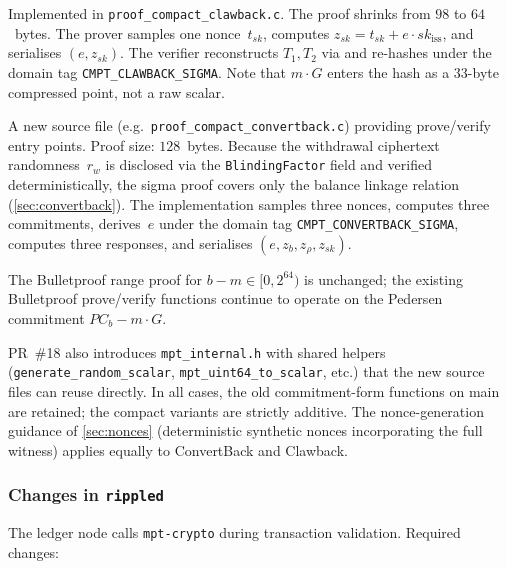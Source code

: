\documentclass[11pt]{article}
\theoremstyle{definition}
\newcommand{\sk}{\mathit{sk}}
\begin{document}
\begin{description}[style=nextline,leftmargin=1.5em]
  \item[Clawback (compact $\Pi_{\mathrm{claw}}$).]
    Implemented in \texttt{proof\_compact\_clawback.c}.
    The proof shrinks from $98$ to $64$~bytes.
    The prover samples one nonce~$t_{\sk}$, computes
    $z_{\sk} = t_{\sk} + e \cdot \sk_{\mathrm{iss}}$, and serialises
    $(e, z_{\sk})$.
    The verifier reconstructs $T_1, T_2$ via
     and re-hashes
    under the domain tag \texttt{CMPT\_CLAWBACK\_SIGMA}.
    Note that $m \cdot G$ enters the hash as a $33$-byte compressed
    point, not a raw scalar.

  \item[ConvertBack (compact $\Pi_{\mathrm{cb}}$).]
    A new source file (e.g.\
    \texttt{proof\_compact\_convertback.c}) providing
    prove/verify entry points.
    Proof size: $128$~bytes.
    Because the withdrawal ciphertext randomness~$r_w$ is
    disclosed via the \texttt{BlindingFactor} field and verified
    deterministically, the sigma proof covers only the balance
    linkage relation (\cref{sec:convertback}).
    The implementation samples three nonces, computes three
    commitments, derives~$e$ under the domain tag
    \texttt{CMPT\_CONVERTBACK\_SIGMA}, computes three responses,
    and serialises $(e, z_b, z_\rho, z_{\sk})$.

    The Bulletproof range proof for
    $b - m \in [0, 2^{64})$ is unchanged;
    the existing Bulletproof prove/verify functions continue to
    operate on the Pedersen commitment
    $\mathit{PC}_b - m \cdot G$.
\end{description}

\noindent
PR~\#18 also introduces \texttt{mpt\_internal.h} with shared
helpers (\texttt{generate\_random\_scalar},
\texttt{mpt\_uint64\_to\_scalar}, etc.) that the new source
files can reuse directly.
In all cases, the old commitment-form functions on main are
retained; the compact variants are strictly additive.
The nonce-generation guidance of \cref{sec:nonces} (deterministic
synthetic nonces incorporating the full witness) applies equally to
ConvertBack and Clawback.

\subsubsection*{Changes in \texttt{rippled}}

The ledger node calls \texttt{mpt-crypto} during transaction
validation.
Required changes:
\end{document}
